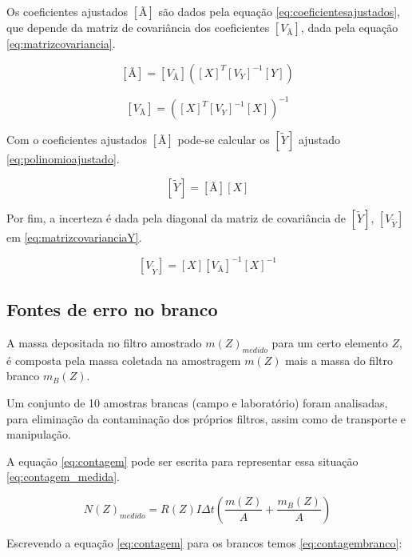 Os coeficientes ajustados $[Ã]$ são dados pela equação \ref{eq:coeficientesajustados},
que depende da matriz de covariância dos coeficientes $[V_{Ã}]$, 
dada pela equação \ref{eq:matrizcovariancia}.

\begin{equation}
  \label{eq:coeficientesajustados}
  [Ã] = [V_{Ã}] ([X]^T {[V_Y]}^{-1} [Y])
\end{equation}

\begin{equation}
  \label{eq:matrizcovariancia}
  [V_{Ã}] = ([X]^T [V_Y]^{-1} [X])^{-1}
\end{equation}

Com o coeficientes ajustados $[Ã]$ pode-se calcular os 
$[\tilde{Y}]$ ajustado \ref{eq:polinomioajustado}.

\begin{equation}
  \label{eq:polinomioajustado}
  [\tilde{Y}] = [Ã][X]
\end{equation}

Por fim, a incerteza é dada pela diagonal da matriz de covariância 
de $[\tilde{Y}]$, $[V_{\tilde{Y}}]$ em \ref{eq:matrizcovarianciaY}.

\begin{equation}
  \label{eq:matrizcovarianciaY}
  [V_{\tilde{Y}}] = [X] [V_{Ã}]^{-1} [X]^{-1}
\end{equation}

\subsection{Fontes de erro no branco}

A massa depositada no filtro amostrado $m(Z)_{medido}$ para um certo 
elemento $Z$, é composta pela massa coletada na amostragem $m(Z)$ 
mais a massa do filtro branco $m_{B}(Z)$. 

Um conjunto de 10 amostras brancas (campo e laboratório) foram analisadas, 
para eliminação da contaminação dos próprios filtros, assim como de 
transporte e manipulação.

A equação \ref{eq:contagem} pode ser escrita para representar essa situação
\ref{eq:contagem_medida}. 

\begin{equation}
  \label{eq:contagem_medida}
  N(Z)_{medido} = R(Z) I\Delta t \left( \frac{m(Z)}{A} + \frac{m_B(Z)}{A} \right)
\end{equation}  

Escrevendo a equação \ref{eq:contagem} para os brancos temos \ref{eq:contagembranco}:

